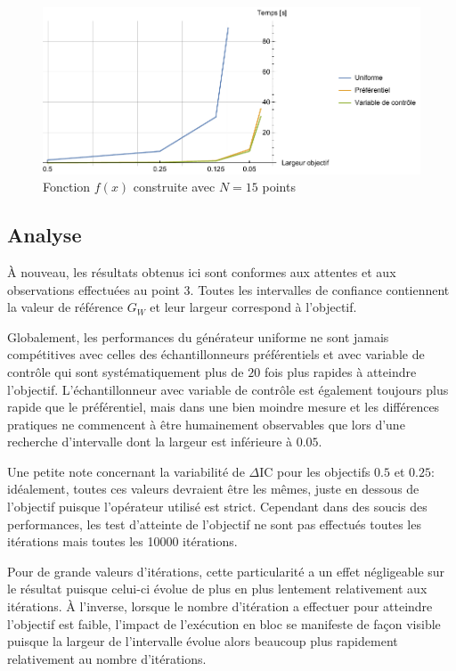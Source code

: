 \documentclass[a4paper,11pt]{article}
\begin{document}
\begin{figure}[h]
	\begin{center}
		\includegraphics[width=15cm]{img_graph2}
	\end{center}
	\caption{Fonction $f(x)$ construite avec $N=15$ points}
\end{figure}

\subsection{Analyse}

À nouveau, les résultats obtenus ici sont conformes aux attentes et aux observations effectuées au point 3. Toutes les intervalles de confiance contiennent la valeur de référence $G_W$ et leur largeur correspond à l'objectif.

Globalement, les performances du générateur uniforme ne sont jamais compétitives avec celles des échantillonneurs préférentiels et avec variable de contrôle qui sont systématiquement plus de $20$ fois plus rapides à atteindre l'objectif. L'échantillonneur avec variable de contrôle est également toujours plus rapide que le préférentiel, mais dans une bien moindre mesure et les différences pratiques ne commencent à être humainement observables que lors d'une recherche d'intervalle dont la largeur est inférieure à $0.05$.

Une petite note concernant la variabilité de $\Delta\text{IC}$ pour les objectifs $0.5$ et $0.25$: idéalement, toutes ces valeurs devraient être les mêmes, juste en dessous de l'objectif puisque l'opérateur utilisé est strict. Cependant dans des soucis des performances, les test d'atteinte de l'objectif ne sont pas effectués toutes les itérations mais toutes les 10000 itérations.

Pour de grande valeurs d'itérations, cette particularité a un effet négligeable sur le résultat puisque celui-ci évolue de plus en plus lentement relativement aux itérations. À l'inverse, lorsque le nombre d'itération a effectuer pour atteindre l'objectif est faible, l'impact de l'exécution en bloc se manifeste de façon visible puisque la largeur de l'intervalle évolue alors beaucoup plus rapidement relativement au nombre d'itérations.
\end{document}
